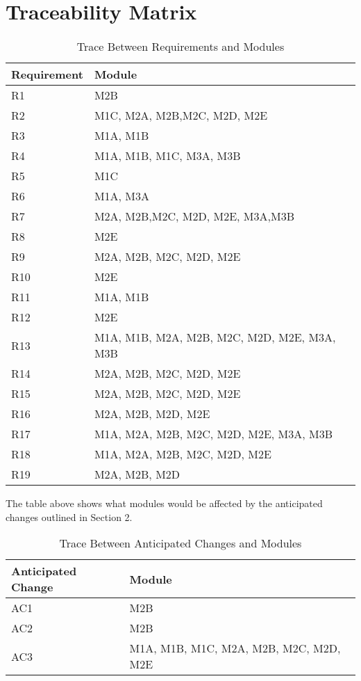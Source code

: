 \documentclass[12pt]{article}
\begin{document}
\section{Traceability Matrix}
\newpage
\begin{table}[!htbp]
\centering
\caption{Trace Between Requirements and Modules}
\begin{tabular}{|C{5cm}||C{5cm}|}
\hline
\textbf{Requirement} & \textbf{Module} \\
\hline
R1 & M2B  \\
\hline
R2 & M1C, M2A, M2B,M2C, M2D, M2E \\
\hline
R3 & M1A, M1B \\
\hline
R4 & M1A, M1B, M1C, M3A, M3B \\
\hline
R5 & M1C \\
\hline
R6 & M1A, M3A \\
\hline
R7 & M2A, M2B,M2C, M2D, M2E, M3A,M3B \\
\hline
R8 & M2E \\
\hline
R9 & M2A, M2B, M2C, M2D, M2E \\
\hline
R10 & M2E \\
\hline
R11 & M1A, M1B \\
\hline
R12 & M2E \\
\hline
R13 & M1A, M1B, M2A, M2B, M2C, M2D, M2E, M3A, M3B \\
\hline
R14 & M2A, M2B, M2C, M2D, M2E \\
\hline
R15 & M2A, M2B, M2C, M2D, M2E  \\
\hline
R16 & M2A, M2B, M2D, M2E  \\
\hline
R17 & M1A, M2A, M2B, M2C, M2D, M2E, M3A, M3B \\
\hline
R18 & M1A, M2A, M2B, M2C, M2D, M2E \\
\hline
R19 & M2A, M2B, M2D \\
\hline
\end{tabular}
\end{table} 
\newpage
The table above shows what modules would be affected by the anticipated changes outlined in Section 2.
\begin{table}
\centering
\caption{Trace Between Anticipated Changes and Modules}
\begin{tabular}{|C{5cm}||C{5cm}|}
\hline
\textbf{Anticipated Change} & \textbf{Module} \\
\hline
AC1 & M2B \\
\hline
AC2 & M2B \\
\hline
AC3 & M1A, M1B, M1C, M2A, M2B, M2C, M2D, M2E \\
\hline
\end{tabular}
\end{table} 
\end{document}
